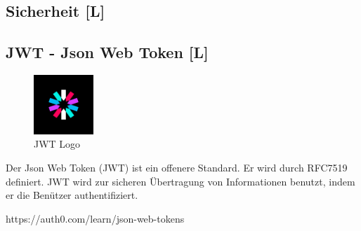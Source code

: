 \subsection{Sicherheit [L]}

\subsection{JWT - Json Web Token [L]}
\begin{figure}
  \begin{center}
    \includegraphics[width=0.2\textwidth]{pics/jwt_logo.png}
   \caption{JWT Logo}
  \end{center}
\end{figure}
Der Json Web Token (JWT) ist ein offenere Standard. Er wird durch RFC7519 definiert. JWT wird zur sicheren Übertragung von Informationen benutzt, indem er die Benützer authentifiziert. 


https://auth0.com/learn/json-web-tokens
